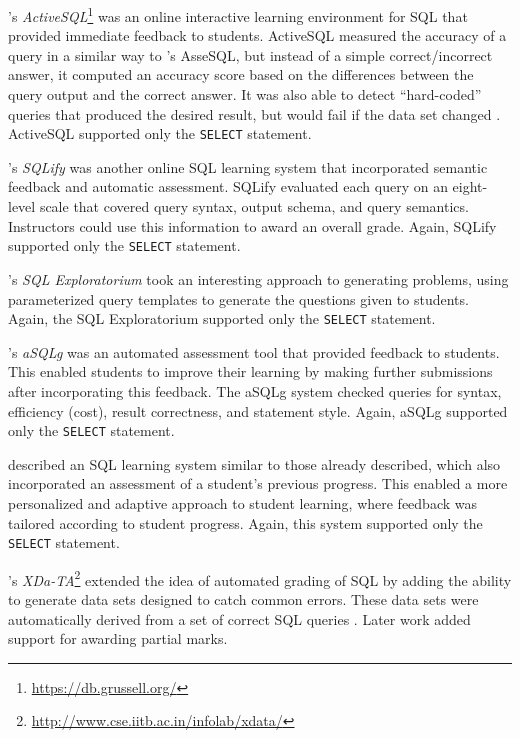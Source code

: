 \documentclass[sigconf, authordraft, capitalise]{acmart}
\begin{document}
\citeauthor{Russell.G-2004a-Improving}'s \emph{ActiveSQL}\footnote{\url{https://db.grussell.org/}} \cite{Russell.G-2004a-Improving,Russell.G-2005a-Online} was an online interactive learning environment for SQL that provided immediate feedback to students. ActiveSQL measured the accuracy of a query in a similar way to \citeauthor{Prior.J-2004a-Backwash}'s AsseSQL, but instead of a simple correct/incorrect answer, it computed an accuracy score based on the differences between the query output and the correct answer. It was also able to detect ``hard-coded'' queries that produced the desired result, but would fail if the data set changed \cite{Russell.G-2005a-Online}. ActiveSQL supported only the \texttt{SELECT} statement.

\citeauthor{Dekeyser.S-2007a-Computer}'s \emph{SQLify} \cite{Dekeyser.S-2007a-Computer} was another online SQL learning system that incorporated semantic feedback and automatic assessment. SQLify evaluated each query on an eight-level scale that covered query syntax, output schema, and query semantics. Instructors could use this information to award an overall grade. Again, SQLify supported only the \texttt{SELECT} statement.

\citeauthor{Brusilovsky.P-2010a-Learning}'s \emph{SQL Exploratorium} \cite{Brusilovsky.P-2010a-Learning} took an interesting approach to generating problems, using parameterized query templates to generate the questions given to students. Again, the SQL Exploratorium supported only the \texttt{SELECT} statement.

\citeauthor{Kleiner.C-2013a-Automated}'s \emph{aSQLg} \cite{Kleiner.C-2013a-Automated} was an automated assessment tool that provided feedback to students. This enabled students to improve their learning by making further submissions after incorporating this feedback. The aSQLg system checked queries for syntax, efficiency (cost), result correctness, and statement style. Again, aSQLg supported only the \texttt{SELECT} statement.

\citeauthor{Kenny.C-2005a-Automated} \cite{Kenny.C-2005a-Automated} described an SQL learning system similar to those already described, which also incorporated an assessment of a student's previous progress. This enabled a more personalized and adaptive approach to student learning, where feedback was tailored according to student progress. Again, this system supported only the \texttt{SELECT} statement.

\citeauthor{Bhangdiya.A-2015a-XDa-TA}'s \emph{XDa-TA}\footnote{\url{http://www.cse.iitb.ac.in/infolab/xdata/}} extended the idea of automated grading of SQL by adding the ability to generate data sets designed to catch common errors. These data sets were automatically derived from a set of correct SQL queries \cite{Bhangdiya.A-2015a-XDa-TA,Chandra.B-2015a-Data}. Later work \cite{Chandra.B-2016a-Partial} added support for awarding partial marks.
\end{document}
